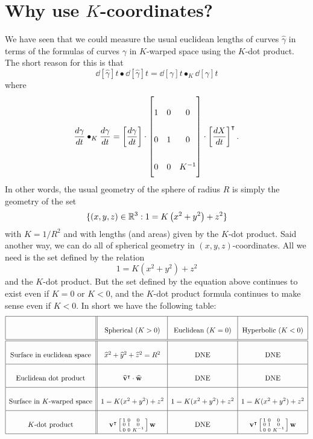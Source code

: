 \documentclass[newpage,hints,handout]{ximera}
\begin{document}
\section{Why use $K$-coordinates?}

We have seen that we could measure the usual euclidean lengths of
curves $\hat{\gamma}$ in terms of the formulas of curves $\gamma$ in $K$-warped
space using the $K$-dot product. The short reason for this is that
\[
\dd[\hat{\gamma}]{t}\bullet\dd[\hat{\gamma}]{t}=\dd[\gamma]{t}\bullet_{K}\dd[\gamma]{t}
\]
where
\[
\dd[\gamma]{t}\bullet_{K}\dd[\gamma]{t}
=\left[\dd[\gamma]{t}\right]\cdot\begin{bmatrix}
1 & 0 & 0\\
0 & 1 & 0\\
0 & 0 & K^{-1}%
\end{bmatrix}
\cdot\left[\dd[X]{t}\right]^\transpose.
\]
In other words, the usual geometry of the sphere of radius $R$ is
simply the geometry of the set
\[
\{(x,y,z)\in\mathbb R^3:1 = K\left(x^2 + y^2\right) +z^2\}
\]
with $K=1/R^{2}$ and with lengths (and areas) given by the $K$-dot
product. Said another way, we can do all of spherical geometry in
$(x,y,z)$-coordinates. All we need is the set defined by the relation
\[
1 = K\left(x^2 + y^2\right) +z^2
\]
and the $K$-dot product. But the set defined by the equation above
continues to exist even if $K=0$ or $K<0$, and the $K$-dot product
formula continues to make sense even if $K<0$. In short we have the
following table:
\[
  {\renewcommand{\arraystretch}{2.7}
  \begin{array}{|c||c|c|c|}\hline
    & \text{Spherical (}K>0) & \text{Euclidean (}K=0) & \text{Hyperbolic (}K<0)\\
    \hline\hline
    \text{Surface in euclidean space}
    & \hat{x}^{2}+\hat{y}^{2}+\hat{z}^{2}=R^{2} & \text{DNE}  & \text{DNE} \\\hline
    \text{Euclidean dot product} & \hat{\mathbf v}^\transpose\cdot \hat{\mathbf w}
                             & \text{DNE}  & \text{DNE}\\\hline
    \text{Surface in $K$-warped space}
    & {1=K(x^{2}+y^{2})+z^{2}} & 1=K(x^{2}+y^{2})+z^{2} & 1=K(x^{2}+y^{2})+z^{2}\\\hline
    K\text{-dot product}
    & \mathbf v^\transpose \left[\begin{smallmatrix}
        1 & 0 & 0\\
        0 & 1 & 0\\
        0 & 0 & K^{-1}
      \end{smallmatrix}\right] \mathbf w &  \text{DNE}
    & \mathbf{v}^\transpose \left[\begin{smallmatrix}1 & 0 & 0\\ 0 & 1 & 0\\ 0 & 0 & K^{-1}\end{smallmatrix}\right]\mathbf w \\\hline
\end{array}}
\]
\end{document}
